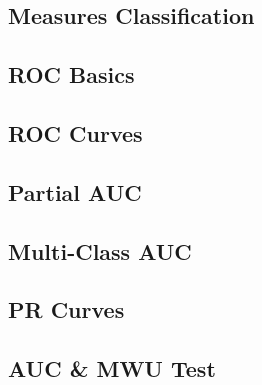 \subsection{Measures Classification}


\subsection{ROC Basics}


\subsection{ROC Curves}


\subsection{Partial AUC}


\subsection{Multi-Class AUC}


\subsection{PR Curves}


\subsection{AUC \& MWU Test}

